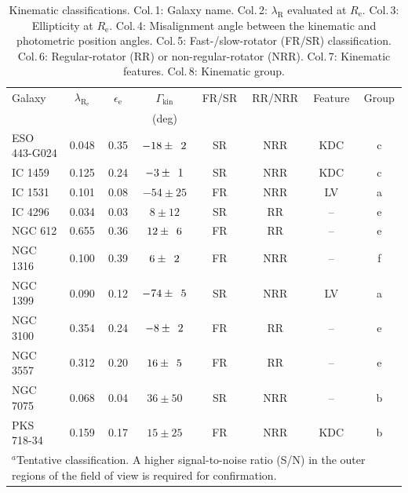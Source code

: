 \documentclass[a4paper,fleqn,usenatbib]{mnras}
\begin{document}
	\begin{table}
		\centering
		\caption{Kinematic classifications. Col.\,1: Galaxy name. Col.\,2: $\lambda_\text{R}$ evaluated at $R_\text{e}$. Col.\,3: Ellipticity at $R_\text{e}$. Col.\,4: Misalignment angle between the kinematic and photometric position angles. Col.\,5: Fast-/slow-rotator (FR/SR) classification. Col.\,6: Regular-rotator (RR) or non-regular-rotator (NRR). Col.\,7: Kinematic features. Col.\,8: Kinematic group.}
		\label{tab:classify}
		\begin{tabular}{l c c c c c c c}
			\hline
			\hline
			Galaxy		& $\lambda_\mathrm{R_e}$ & $\epsilon_\text{e}$  & $\Gamma_\text{kin}$ & FR/SR 	& RR/NRR 	& Feature & Group 	\\
			 & & & (deg) \\
			\hline 
			ESO 443-G024 & 0.048 & 0.35 & $-18\pm\leavevmode\phantom{0}2$	& SR & NRR & KDC & c \\
			IC 1459 	& 0.125 & 0.24 & \leavevmode\phantom{0}$-3\pm\leavevmode\phantom{0}1$ & SR & NRR & KDC & c \\
			IC 1531 	& 0.101 & 0.08 & $-54\pm25$	& FR & NRR & LV & a \\
			IC 4296		& 0.034 & 0.03 & \leavevmode\phantom{$-0$}$8\pm12$ & SR &\leavevmode\phantom{N}RR & -- & e \\
			NGC 612 	& 0.655 & 0.36 & \leavevmode\phantom{$-$}$12\pm\leavevmode\phantom{0}6$	& FR &\leavevmode\phantom{N}RR & -- & e \\
			NGC 1316 	& 0.100 & 0.39 & \leavevmode\phantom{$-0$}$6\pm\leavevmode\phantom{0}2$ & FR & NRR & -- & f \\
			NGC 1399 	& 0.090 & 0.12 & $-74\pm\leavevmode\phantom{0}5$ & SR & NRR & LV & a \\
			NGC 3100 	& 0.354 & 0.24 & \leavevmode\phantom{0}$-8\pm\leavevmode\phantom{0}2$ & FR &\leavevmode\phantom{N}RR & -- & e \\
			NGC 3557 	& 0.312 & 0.20 & \leavevmode\phantom{$-$}$16\pm\leavevmode\phantom{0}5$ & FR &\leavevmode\phantom{N}RR & -- & e\\
			NGC 7075 	& 0.068 & 0.04 & \leavevmode\phantom{$-$}$36\pm50$ & SR & NRR & -- & b \\
			PKS 718-34  & 0.159 & 0.17 & \leavevmode\phantom{$-$}$15\pm25$ & FR & NRR & KDC\tnote{a} & b\\
			\hline
			\hline
			\multicolumn{8}{L{.7\linewidth}}{$^{a}$Tentative classification. A higher signal-to-noise ratio (S/N) in the outer regions of the field of view is required for confirmation.}


\end{tabular}
\end{table}
\end{document}
